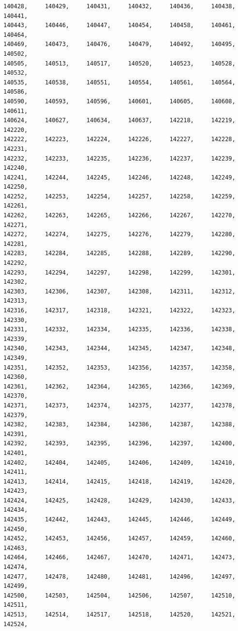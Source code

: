 \documentclass[a4paper,11pt]{report}
\begin{document}
\begin{verbatim}
140428,     140429,     140431,     140432,     140436,     140438,     140441,
140443,     140446,     140447,     140454,     140458,     140461,     140464,
140469,     140473,     140476,     140479,     140492,     140495,     140502,
140505,     140513,     140517,     140520,     140523,     140528,     140532,
140535,     140538,     140551,     140554,     140561,     140564,     140586,
140590,     140593,     140596,     140601,     140605,     140608,     140611,
140624,     140627,     140634,     140637,     142218,     142219,     142220,
142222,     142223,     142224,     142226,     142227,     142228,     142231,
142232,     142233,     142235,     142236,     142237,     142239,     142240,
142241,     142244,     142245,     142246,     142248,     142249,     142250,
142252,     142253,     142254,     142257,     142258,     142259,     142261,
142262,     142263,     142265,     142266,     142267,     142270,     142271,
142272,     142274,     142275,     142276,     142279,     142280,     142281,
142283,     142284,     142285,     142288,     142289,     142290,     142292,
142293,     142294,     142297,     142298,     142299,     142301,     142302,
142303,     142306,     142307,     142308,     142311,     142312,     142313,
142316,     142317,     142318,     142321,     142322,     142323,     142330,
142331,     142332,     142334,     142335,     142336,     142338,     142339,
142340,     142343,     142344,     142345,     142347,     142348,     142349,
142351,     142352,     142353,     142356,     142357,     142358,     142360,
142361,     142362,     142364,     142365,     142366,     142369,     142370,
142371,     142373,     142374,     142375,     142377,     142378,     142379,
142382,     142383,     142384,     142386,     142387,     142388,     142391,
142392,     142393,     142395,     142396,     142397,     142400,     142401,
142402,     142404,     142405,     142406,     142409,     142410,     142411,
142413,     142414,     142415,     142418,     142419,     142420,     142423,
142424,     142425,     142428,     142429,     142430,     142433,     142434,
142435,     142442,     142443,     142445,     142446,     142449,     142450,
142452,     142453,     142456,     142457,     142459,     142460,     142463,
142464,     142466,     142467,     142470,     142471,     142473,     142474,
142477,     142478,     142480,     142481,     142496,     142497,     142499,
142500,     142503,     142504,     142506,     142507,     142510,     142511,
142513,     142514,     142517,     142518,     142520,     142521,     142524,

\end{verbatim}
\end{document}
